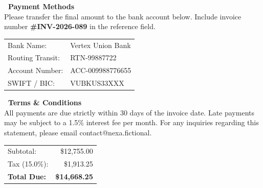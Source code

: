 \documentclass[10pt]{article}
\begin{document}
\vspace{0.5cm}

\begin{minipage}[t]{0.55\textwidth}
    {\color{primary}\bfseries\faCreditCard\ Payment Methods} \\[0.2cm]
    {\small Please transfer the final amount to the bank account below. Include invoice number \textbf{\#INV-2026-089} in the reference field.} \\[0.3cm]
    \begin{tabular}{ll}
        \textcolor{mutedtext}{Bank Name:}      & Vertex Union Bank \\
        \textcolor{mutedtext}{Routing Transit:} & RTN-99887722 \\
        \textcolor{mutedtext}{Account Number:}  & ACC-009988776655 \\
        \textcolor{mutedtext}{SWIFT / BIC:}     & VUBKUS33XXX \\
    \end{tabular}
    
    \vspace{0.4cm}
    {\color{primary}\bfseries\faInfoCircle\ Terms \& Conditions} \\[0.1cm]
    {\footnotesize All payments are due strictly within 30 days of the invoice date. Late payments may be subject to a 1.5\% interest fee per month. For any inquiries regarding this statement, please email contact@nexa.fictional.}
\end{minipage}%
\hfill
\begin{minipage}[t]{0.4\textwidth}
    \raggedleft
    \begin{tcolorbox}[
        colback=lightbg,
        colframe=bordercol,
        arc=4pt,
        boxrule=1pt,
        left=10pt, right=10pt, top=10pt, bottom=10pt
    ]
        \begin{tabularx}{\textwidth}{L R}
            \textcolor{mutedtext}{Subtotal:} & \$12,755.00 \\
            \textcolor{mutedtext}{Tax (15.0\%):} & \$1,913.25 \\
            \midrule
            \textbf{\color{primary}Total Due:} & \textbf{\color{primary}\$14,668.25} \\
        \end{tabularx}
    \end{tcolorbox}
\end{minipage}
\end{document}
